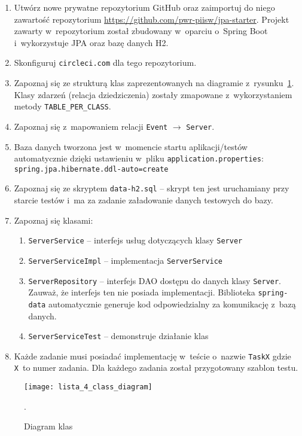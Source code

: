 \documentclass[12pt]{article}
\begin{document}
        \begin{enumerate}
            \item Utwórz nowe prywatne repozytorium GitHub oraz zaimportuj do niego zawartość repozytorium \url{https://github.com/pwr-piisw/jpa-starter}. Projekt zawarty w~repozytorium został zbudowany w~oparciu o~Spring Boot i~wykorzystuje JPA oraz bazę danych H2.
            \item Skonfiguruj \texttt{circleci.com} dla tego repozytorium.
            \item Zapoznaj się ze strukturą klas zaprezentowanych na diagramie z~rysunku~\ref{fig:class-diagram}. Klasy zdarzeń (relacja dziedziczenia) zostały zmapowane z~wykorzystaniem metody \texttt{TABLE\_PER\_CLASS}.
            \item Zapoznaj się z~mapowaniem relacji \texttt{Event} $\rightarrow$ \texttt{Server}.
            \item Baza danych tworzona jest w~momencie startu aplikacji/testów automatycznie dzięki ustawieniu w~pliku \texttt{application.properties}: \texttt{spring\-.jpa\-.hibernate\-.ddl-auto=create}
            \item Zapoznaj się ze skryptem \texttt{data-h2.sql} -- skrypt ten jest uruchamiany przy starcie testów i~ma za zadanie załadowanie danych testowych do bazy.
            \item Zapoznaj się klasami:
                \begin{enumerate}
                    \item \texttt{ServerService} – interfejs usług dotyczących klasy \texttt{Server}
                    \item \texttt{ServerServiceImpl} – implementacja \texttt{ServerService}
                    \item \texttt{ServerRepository} – interfejs DAO dostępu do danych klasy \texttt{Server}. Zauważ, że interfejs ten nie posiada implementacji. Biblioteka \texttt{spring-data} automatycznie generuje kod odpowiedzialny za komunikację z~bazą danych.
                    \item \texttt{ServerServiceTest} – demonstruje działanie klas
                \end{enumerate}
            \item Każde zadanie musi posiadać implementację w~teście o~nazwie \texttt{TaskX} gdzie \texttt{X}~to numer zadania. Dla każdego zadania został przygotowany szablon testu.
        \end{enumerate}
        \begin{figure}[ht]
            \centering
            \texttt{[image: lista\_4\_class\_diagram]}
            \caption{Diagram klas}.
            \label{fig:class-diagram}
        \end{figure}
\end{document}
